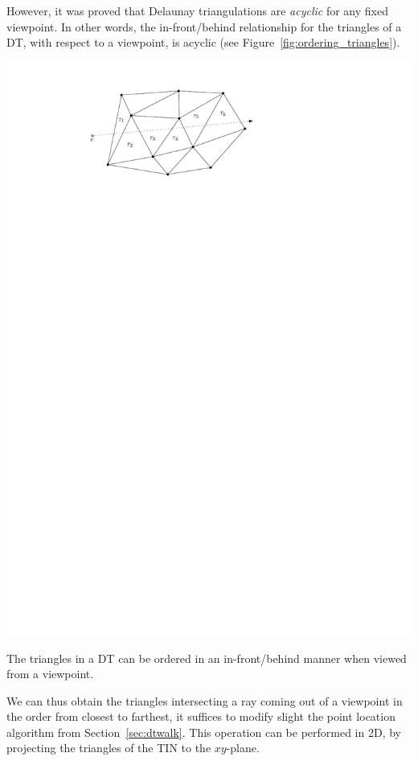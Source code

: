 However, it was proved that Delaunay triangulations are \emph{acyclic} for any fixed viewpoint. 
In other words, the in-front/behind relationship for the triangles of a DT, with respect to a viewpoint, is acyclic (see Figure~\ref{fig:ordering_triangles}).
\begin{marginfigure}
  \centering
  \includegraphics[width=\linewidth]{ordering_triangles.pdf}
  \caption{The triangles in a DT can be ordered in an in-front/behind manner when viewed from a viewpoint.}%
  \label{fig:ordering_triangles}
\end{marginfigure}

We can thus obtain the triangles intersecting a ray coming out of a viewpoint in the order from closest to farthest, it suffices to modify slight the point location algorithm from Section~\ref{sec:dtwalk}.
This operation can be performed in 2D, by projecting the triangles of the TIN to the $xy$-plane.

